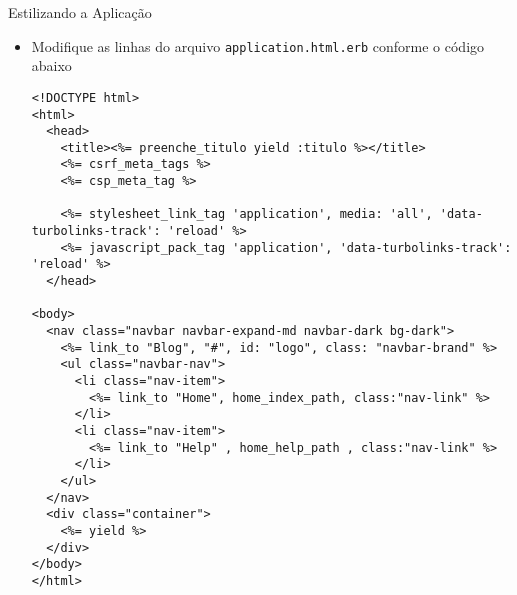 \begin{frame}{Estilizando a Aplicação}
    \begin{itemize}
      \item Modifique as linhas do arquivo \verb|application.html.erb| conforme o código abaixo
      \begin{lstlisting}[style=RubyInputStyle, basicstyle=\tiny\ttfamily, caption=app/views/layouts/application.html.erb, firstline=12, lastline=27]
<!DOCTYPE html>
<html>
  <head>
    <title><%= preenche_titulo yield :titulo %></title>
    <%= csrf_meta_tags %>
    <%= csp_meta_tag %>

    <%= stylesheet_link_tag 'application', media: 'all', 'data-turbolinks-track': 'reload' %>
    <%= javascript_pack_tag 'application', 'data-turbolinks-track': 'reload' %>
  </head>

<body>
  <nav class="navbar navbar-expand-md navbar-dark bg-dark">
    <%= link_to "Blog", "#", id: "logo", class: "navbar-brand" %>
    <ul class="navbar-nav">
      <li class="nav-item">
        <%= link_to "Home", home_index_path, class:"nav-link" %>
      </li>
      <li class="nav-item">
        <%= link_to "Help" , home_help_path , class:"nav-link" %>
      </li>
    </ul>
  </nav>
  <div class="container">
    <%= yield %>
  </div>
</body>
</html>
      \end{lstlisting}
  \end{itemize}
\end{frame} 